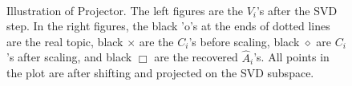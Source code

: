 \begin{figure}[h]
     \begin{center}

        \\ 

    \end{center}
    \caption{Illustration of Projector. The left figures are the $V_i$'s after the SVD step. In the right figures, the black 'o's at the ends of dotted lines are the real topic, black $\times$ are the $C_i$'s before scaling, black $\diamond$ are $C_i$'s after scaling, and black $\Box$ are the recovered $\hat{A}_i$'s. All points in the plot are after shifting and projected on the SVD subspace. }
   \label{fig:subfigures}
\end{figure}



